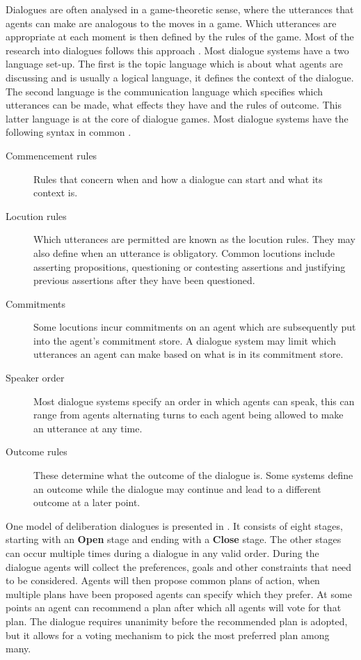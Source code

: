 \documentclass[a4paper]{article}
\begin{document}
Dialogues are often analysed in a game-theoretic sense, where the utterances
that agents can make are analogous to the moves in a game. Which utterances are
appropriate at each moment is then defined by the rules of the game. Most of
the research into dialogues follows this approach
\cite{prakken2006,prakken2009}. Most dialogue systems have a two language
set-up. The first is the topic language which is about what agents are
discussing and is usually a logical language, it defines the context of the
dialogue. The second language is the communication language which specifies
which utterances can be made, what effects they have and the rules of outcome.
This latter language is at the core of dialogue games. Most dialogue systems
have the following syntax in common \cite{prakken2006,prakken2009,mcburney2009}.
\begin{description}
	\item[Commencement rules] Rules that concern when and how a dialogue can
	start and what its context is.
	\item[Locution rules] Which utterances are permitted are known as the
	locution rules. They may also define when an utterance is obligatory.
	Common locutions include asserting propositions, questioning or contesting
	assertions and justifying previous assertions after they have been
	questioned.
	\item[Commitments] Some locutions incur commitments on an agent which are
	subsequently put into the agent's commitment store. A dialogue system may
	limit which utterances an agent can make based on what is in its commitment
	store.
	\item[Speaker order] Most dialogue systems specify an order in which agents
	can speak, this can range from agents alternating turns to each agent being
	allowed to make an utterance at any time.
	\item[Outcome rules] These determine what the outcome of the dialogue is.
	Some systems define an outcome while the dialogue may continue and lead to
	a different outcome at a later point.
\end{description}

One model of deliberation dialogues is presented in \cite{mcburney2007}. It
consists of eight stages, starting with an \textbf{Open} stage and ending with
a \textbf{Close} stage. The other stages can occur multiple times during a
dialogue in any valid order. During the dialogue agents will collect the
preferences, goals and other constraints that need to be considered. Agents
will then propose common plans of action, when multiple plans have been
proposed agents can specify which they prefer. At some points an agent can
recommend a plan after which all agents will vote for that plan. The dialogue
requires unanimity before the recommended plan is adopted, but it allows for a
voting mechanism to pick the most preferred plan among many.



\end{document}
